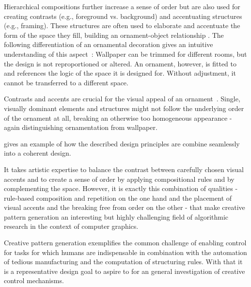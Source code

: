 Hierarchical compositions further increase a sense of order but are also used for creating contrasts (e.g., foreground vs. background) and accentuating structures (e.g., framing). These structures are often used to elaborate and accentuate the form of the space they fill, building an ornament-object relationship \cite{arbruzzo_2006_dec}. The following differentiation of an ornamental decoration gives an intuitive understanding of this aspect~\cite{arbruzzo_2006_dec}: Wallpaper can be trimmed for different rooms, but the design is not reproportioned or altered. An ornament, however, is fitted to and references the logic of the space it is designed for. Without adjustment, it cannot be transferred to a different space.

Contrasts and accents are crucial for the visual appeal of an ornament~\cite{wong_1998_cgf,ward_1896_tpo, moughtin_1999_udo}. Single, visually dominant elements and structures might not follow the underlying order of the ornament at all, breaking an otherwise too homogeneous appearance - again distinguishing ornamentation from wallpaper.

 gives an example of how the described design principles are combine seamlessly into a coherent design.

It takes artistic expertise to balance the contrast between carefully chosen visual accents and to create a sense of order by applying compositional rules and by complementing the space. However, it is exactly this combination of qualities - rule-based composition and repetition on the one hand and the placement of visual accents and the breaking free from order on the other - that make creative pattern generation an interesting but highly challenging field of algorithmic research in the context of computer graphics.

Creative pattern generation exemplifies the common challenge of enabling control for tasks for which humans are indispensable in combination with the automation of tedious manufacturing and the computation of structuring rules. With that it is a representative design goal to aspire to for an general investigation of creative control mechanisms.






